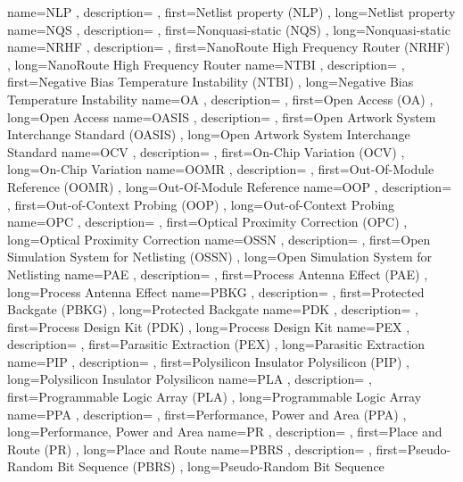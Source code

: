 { name={NLP}
, description={}
, first={Netlist property (NLP)}
, long={Netlist property}
}
{ name={NQS}
, description={}
, first={Nonquasi-static (NQS)}
, long={Nonquasi-static}
}
{ name={NRHF}
, description={}
, first={NanoRoute High Frequency Router (NRHF)}
, long={NanoRoute High Frequency Router}
}
{ name={NTBI}
, description={}
, first={Negative Bias Temperature Instability (NTBI)}
, long={Negative Bias Temperature Instability}
}
{ name={OA}
, description={}
, first={Open Access (OA)}
, long={Open Access}
}
{ name={OASIS}
, description={}
, first={Open Artwork System Interchange Standard (OASIS)}
, long={Open Artwork System Interchange Standard}
}
{ name={OCV}
, description={}
, first={On-Chip Variation (OCV)}
, long={On-Chip Variation}
}
{ name={OOMR}
, description={}
, first={Out-Of-Module Reference (OOMR)}
, long={Out-Of-Module Reference}
}
{ name={OOP}
, description={}
, first={Out-of-Context Probing (OOP)}
, long={Out-of-Context Probing}
}
{ name={OPC}
, description={}
, first={Optical Proximity Correction (OPC)}
, long={Optical Proximity Correction}
}
{ name={OSSN}
, description={}
, first={Open Simulation System for Netlisting (OSSN)}
, long={Open Simulation System for Netlisting}
}
{ name={PAE}
, description={}
, first={Process Antenna Effect (PAE)}
, long={Process Antenna Effect}
}
{ name={PBKG}
, description={}
, first={Protected Backgate (PBKG)}
, long={Protected Backgate}
}
{ name={PDK}
, description={}
, first={Process Design Kit (PDK)}
, long={Process Design Kit}
}
{ name={PEX}
, description={}
, first={Parasitic Extraction (PEX)}
, long={Parasitic Extraction}
}
{ name={PIP}
, description={}
, first={Polysilicon Insulator Polysilicon (PIP)}
, long={Polysilicon Insulator Polysilicon}
}
{ name={PLA}
, description={}
, first={Programmable Logic Array (PLA)}
, long={Programmable Logic Array}
}
{ name={PPA}
, description={}
, first={Performance, Power and Area (PPA)}
, long={Performance, Power and Area}
}
{ name={PR}
, description={}
, first={Place and Route (PR)}
, long={Place and Route}
}
{ name={PBRS}
, description={}
, first={Pseudo-Random Bit Sequence (PBRS)}
, long={Pseudo-Random Bit Sequence}
}
